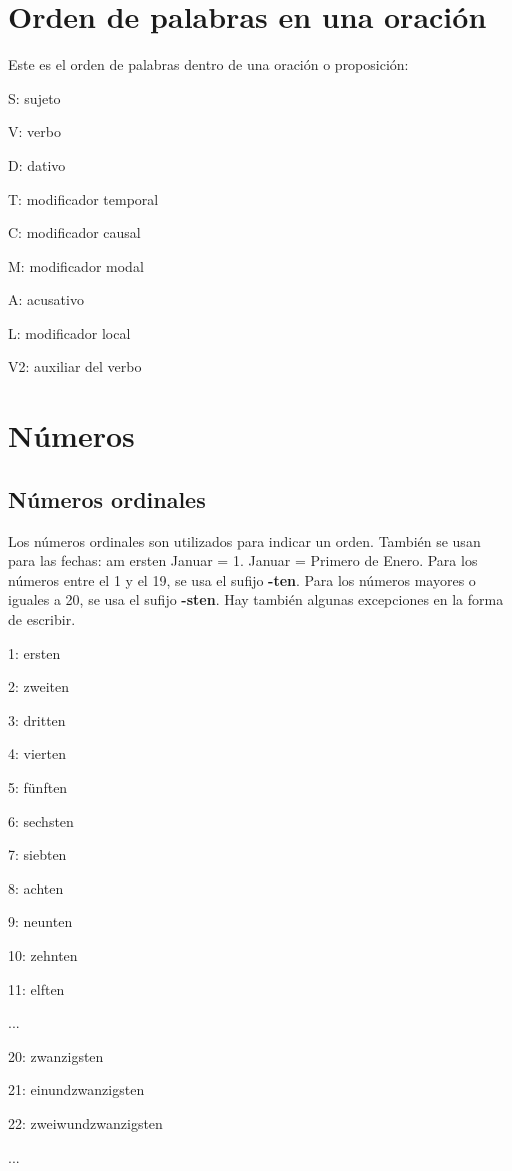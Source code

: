 \section{Orden de palabras en una oración}
Este es el orden de palabras dentro de una oración o proposición:
\begin{myitemize}
\item S: sujeto
\item V: verbo
\item D: dativo
\item T: modificador temporal
\item C: modificador causal
\item M: modificador modal
\item A: acusativo
\item L: modificador local
\item V2: auxiliar del verbo
\end{myitemize}

\section{Números}
\subsection{Números ordinales}
Los números ordinales son utilizados para indicar un orden. También se usan para las fechas: am ersten Januar = 1. Januar = Primero de Enero. Para los números entre el 1 y el 19, se usa el sufijo \textbf{-ten}. Para los números mayores o iguales a 20, se usa el sufijo \textbf{-sten}. Hay también algunas excepciones en la forma de escribir.
\begin{multicols}{2}
\begin{myitemize}
\item 1: ersten
\item 2: zweiten
\item 3: dritten
\item 4: vierten
\item 5: fünften
\item 6: sechsten
\item 7: siebten
\item 8: achten
\item 9: neunten
\item 10: zehnten
\item 11: elften
\item ...
\item 20: zwanzigsten
\item 21: einundzwanzigsten
\item 22: zweiwundzwanzigsten
\item ...
\end{myitemize}
\end{multicols}

